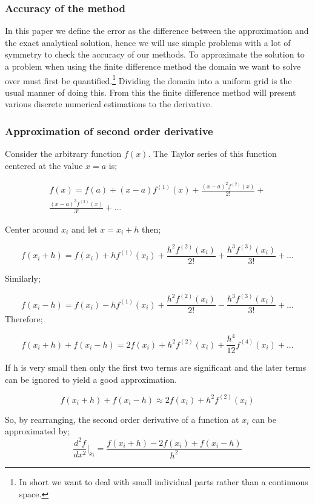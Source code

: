 \documentclass[aps,twocolumn,pre,nofootinbib,10pt]{revtex4-1}
\begin{document}
\subsubsection{Accuracy of the method}

\par\hspace{4mm} In this paper we define the error as the difference between the approximation and the exact analytical solution, hence we will use simple problems with a lot of symmetry to check the accuracy of our methods. To approximate the solution to a problem when using the finite difference method the domain we want to solve over must first be quantified.\footnote{In short we want to deal with small individual parts rather than a continuous space.} Dividing the domain into a uniform grid is the usual manner of doing this. From this the finite difference method will present various discrete numerical estimations to the derivative.

\subsubsection{Approximation of second order derivative}
Consider the arbitrary function \(f(x)\). The Taylor series of this function centered at the value \(x=a\) is;

\begin{gather*}
f(x) = f(a) +(x-a)f^{(1)}(x)+\frac{(x-a)^{2}f^{(2)}(x)}{2!}+ \\
\frac{(x-a)^{3}f^{(3)}(x)}{3!}+...
\end{gather*}

Center around $x_i$ and let \(x=x_i + h\) then;

\[f(x_i+h)=f(x_i)+hf^{(1)}(x_i)+\frac{h^2f^{(2)}(x_i)}{2!}+\frac{h^3f^{(3)}(x_i)}{3!}+...\]

Similarly;

\[f(x_i-h)=f(x_i)-hf^{(1)}(x_i)+\frac{h^2f^{(2)}(x_i)}{2!}-\frac{h^3f^{(3)}(x_i)}{3!}+...\]
Therefore;

\[f(x_i+h)+f(x_i-h) = 2f(x_i) + h^2f^{(2)}(x_i) +\frac{h^4}{12}f^{(4)}(x_i)+...\]

If h is very small then only the first two terms are significant and the later terms can be ignored to yield a good approximation.

\[f(x_i+h)+f(x_i-h) \approx 2f(x_i) + h^2f^{(2)}(x_i)\]

So, by rearranging, the second order derivative of a function at \(x_i\) can be approximated by;
\[\frac{d^2f}{dx^2}\Bigg|_{x_i} = \frac{f(x_i+h)-2f(x_i)+f(x_i-h)}{h^2}\]
\end{document}
